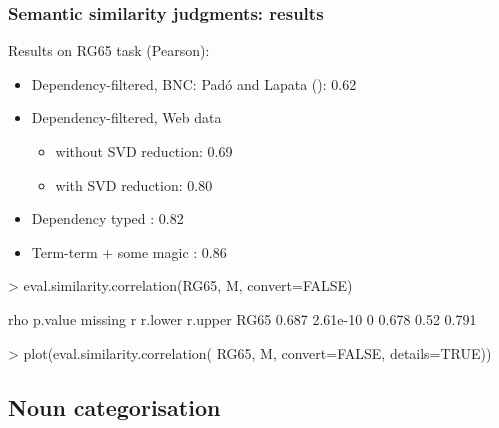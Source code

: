 \documentclass[t]{beamer} %
\begin{document}
\begin{frame}[fragile]
  \frametitle{Semantic similarity judgments: results}

  Results on RG65 task (Pearson):
  \begin{itemize}
  \item Dependency-filtered, BNC: Padó and Lapata (\citeyear{Pado:Lapata:07}): 0.62
  \item Dependency-filtered, Web data \citep{Herdagdelen:Erk:Baroni:09}
    \begin{itemize}
    \item without SVD reduction: 0.69
    \item with SVD reduction: 0.80
    \end{itemize}
  \item Dependency typed \citep{Baroni:Lenci:10}: 0.82
  \item Term-term + some magic \citep{Hassan:Mihalcea:11}: 0.86
  \end{itemize}

  \vfill
\begin{Rcode}
> eval.similarity.correlation(RG65, M, convert=FALSE)\begin{Rout}
       rho  p.value missing     r r.lower r.upper
RG65 0.687 2.61e-10       0 0.678    0.52   0.791\end{Rout}
> plot(eval.similarity.correlation( 
       RG65, M, convert=FALSE, details=TRUE))
\end{Rcode}
\end{frame}


\subsection{Noun categorisation}
\end{document}
